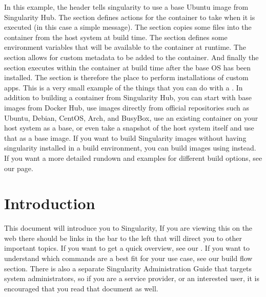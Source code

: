 \documentclass[letterpaper,10pt,english]{sphinxmanual}
\begin{document}
In this example, the header tells singularity to use a base Ubuntu
image from Singularity Hub. The  section defines actions for the
container to take when it is executed (in this case a simple message).
The  section copies some files into the container from the host system
at build time. The  section defines some environment variables that
will be available to the container at runtime. The  section allows for
custom metadata to be added to the container. And finally the  section
executes within the container at build time after the base OS has been
installed. The  section is therefore the place to perform installations
of custom apps.
This is a very small example of the things that you can do with a {\hyperref[\detokenize{container_recipes:container-recipes}]{}} . In
addition to building a container from Singularity Hub, you can start
with base images from Docker Hub, use images directly from official
repositories such as Ubuntu, Debian, CentOS, Arch, and BusyBox, use an
existing container on your host system as a base, or even take a
snapshot of the host system itself and use that as a base image.
If you want to build Singularity images without having singularity
installed in a build environment, you can build images using
instead. If you want a more detailed rundown and examples for
different build options, see our {\hyperref[\detokenize{singularity_flow:singularity-flow}]{}} page.


\chapter{Introduction}
\label{\detokenize{introduction:introduction}}\label{\detokenize{introduction::doc}}
This document will introduce you to Singularity, If you are viewing this on the web there should be links in the
bar to the left that will direct you to other important topics. If you
want to get a quick overview, see our {\hyperref[\detokenize{quick_start:quick-start}]{}}. If you want to
understand which commands are a best fit for your use case, see our build
flow section. There is also a separate Singularity Administration Guide
that targets system administrators, so if you are a service provider, or
an interested user, it is encouraged that you read that document as
well.
\end{document}
